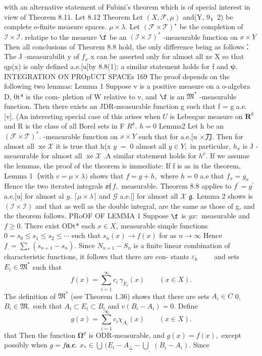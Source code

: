 with an alternative statement of Fubini's theorem which is of special interest in view of Theorem 8.11. Let 8.12 Theorem Let $(X,{\mathcal{F}},\mu)$ and(Y, 9，2) be complete o-finite measure spaces. $\mu\times\lambda.$ Let $({\mathcal{F}}\times{\mathcal{T}})^{\star}$ be the completion of ${\mathcal{I}}\times{\mathcal{I}}.$ relatipe to the measure $\boldsymbol{\f}$ be an $({\mathcal{I}}\times{\mathcal{I}})^{*}$ -measurable function on $x\times Y$ Then all conclusions of Theorem 8.8 hold, the only difference being as follows： The J -measurabilit y of $f_{x}$ x can be asserted only for almost all xe X so that qp(x) is only defined a.e.[u]by 8.8(1); a similar statement holds for f and ${\boldsymbol{\psi}}.$INTEGRATION ON PROpUCT SPACEs 169 The proof depends on the following two lemmas: Lemma 1 Suppose v is a positive measure on a o-algebra D, 0t* is the com- pletion of W relative to v, and $\boldsymbol{\f}$ is an ${\mathfrak{M}}^{\ast}$ -measurable function. Then there exists an JDR-measurable function g such that f = g a.e. [v]. (An interesting special case of this arises when ${\boldsymbol{\mathit{U}}}$ is Lebesgue measure on ${\boldsymbol{R}}^{k}$ and R is the class of all Borel sets in F $R^{k}.$ $h=0$ Lemma2 Let h be an $({\mathcal{F}}\times{\mathcal{T}})^{*}.$ -measurable function on $x\times Y$ such that for a.e.[u ×刀. Then for almost all $\operatorname{xe}{\mathcal{X}}$ it is true that h(x $\scriptstyle y\;=\;0$ almost all $y\in Y;$ in particular, $h_{x}$ is J -measurable for almost all $\operatorname{xe}{\mathcal{X}}$ .A similar statement holds for $h^{\nu}.$ If we assume the lemmas, the proof of the theorem is immediate: If f is as in the theorem, Lemma 1（with $v=\mu\times\lambda)$ shows that $f=g+h,$ where $h=0$ a.e that $f_{x}=g_{x}$ Hence the two iterated integrals ${\mathfrak{o f}}\,f,$ measurable. Theorem 8.8 applies to $f^{\prime}=g^{\prime}$ a.e.[u] for almost al $y.$ $\lceil\mu\times\lambda\rceil$ and $\scriptstyle{\mathcal{G}}$ a.e.[] for almost all $\scriptstyle{\mathcal{X}}$ ${\mathfrak{g}}.$ Lemma 2 shows is $({\mathcal{I}}\times{\mathcal{I}})$ and that as well as the double integral, are the same as those of g, and the theorem follows. PRoOF OF LEMMA 1 Suppose $\boldsymbol{\f}$ is $\scriptstyle y x:$ measurable and $f\geq0.$ There exist ODt* each $x\in X_{\circ}$ measurable simple functions $0=s_{0}\leq s_{1}\leq s_{2}\leq\cdots$ such that $s_{n}(x)\to f(x)$ for as $n\to\infty$ Hence $f_{.}=\sum_{*}(s_{n+1}-s_{n}).$ Since $N_{n+1}-S_{n}$ is a finite linear combination of characteristic functions, it follows that there are con- stants $\scriptstyle{\varepsilon_{k}}\quad\quad$ and sets $E_{i}\in{\mathfrak{M}}^{*}$ such that $$ f(x)=\sum_{i=1}^{\infty}c_{i}\,\gamma_{E_{i}}(x)\qquad(x\in X). $$ The definition of ${\mathfrak{M}}^{*}$ (see Theorem 1.36) shows that there are sets $\scriptstyle A_{i}\in C$ 0, $B_{i}\in{\mathfrak{M}},$ such that $A_{i}\subset E_{i}\subset B_{i}$ and $v(B_{i}-A_{i})=0.$ Define $$ g(x)=\sum_{i=1}^{\infty}c_{i}\chi_{A_{i}}(x)\qquad(x\in X). $$ that Then the function $\mathbf{\Omega}^{g}$ is ODR-measurable, and $g(x)=f(x),$ except possibly when $g=f\mathbf{a}.\mathbf{c}.$ ${x}_{\ast}\in\bigcup\,(E_{i}-A_{\frac{i}{-}}-\underline{{{\bigcup}}}\,(B_{i}-A_{i}).$ Since 